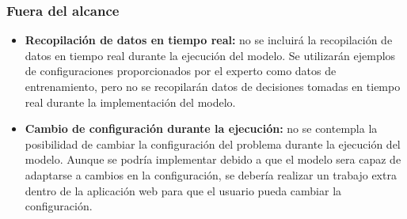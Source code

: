 \subsubsection{Fuera del alcance}
\begin{itemize}
    \item \textbf{Recopilación de datos en tiempo real:} no se incluirá la recopilación de datos en tiempo
          real durante la ejecución del modelo. Se utilizarán ejemplos de configuraciones proporcionados
          por el experto como datos de entrenamiento, pero no se recopilarán datos de decisiones tomadas
          en tiempo real durante la implementación del modelo.
    \item \textbf{Cambio de configuración durante la ejecución:} no se contempla la posibilidad de cambiar
          la configuración del problema durante la ejecución del modelo. Aunque se podría implementar debido
          a que el modelo sera capaz de adaptarse a cambios en la configuración, se debería realizar un
          trabajo extra dentro de la aplicación web para que el usuario pueda cambiar la configuración.
\end{itemize}

\pagebreak